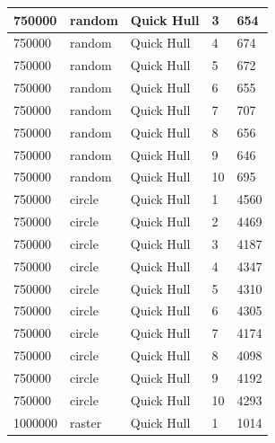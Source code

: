 \documentclass[12pt]{article}
\begin{document}
\begin{longtable}{|l|l|l|l|l|}
750000       & random            & Quick Hull & 3          & 654                           \\ \hline
750000       & random            & Quick Hull & 4          & 674                           \\ \hline
750000       & random            & Quick Hull & 5          & 672                           \\ \hline
750000       & random            & Quick Hull & 6          & 655                           \\ \hline
750000       & random            & Quick Hull & 7          & 707                           \\ \hline
750000       & random            & Quick Hull & 8          & 656                           \\ \hline
750000       & random            & Quick Hull & 9          & 646                           \\ \hline
750000       & random            & Quick Hull & 10         & 695                           \\ \hline
750000       & circle            & Quick Hull & 1          & 4560                          \\ \hline
750000       & circle            & Quick Hull & 2          & 4469                          \\ \hline
750000       & circle            & Quick Hull & 3          & 4187                          \\ \hline
750000       & circle            & Quick Hull & 4          & 4347                          \\ \hline
750000       & circle            & Quick Hull & 5          & 4310                          \\ \hline
750000       & circle            & Quick Hull & 6          & 4305                          \\ \hline
750000       & circle            & Quick Hull & 7          & 4174                          \\ \hline
750000       & circle            & Quick Hull & 8          & 4098                          \\ \hline
750000       & circle            & Quick Hull & 9          & 4192                          \\ \hline
750000       & circle            & Quick Hull & 10         & 4293                          \\ \hline
1000000      & raster            & Quick Hull & 1          & 1014                          \\ \hline

\end{longtable}
\end{document}
